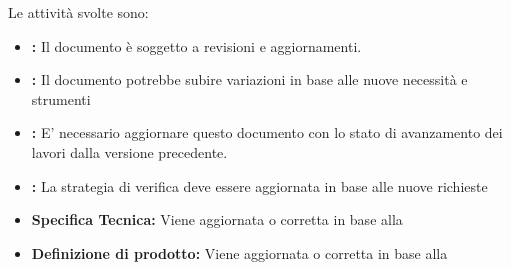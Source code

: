 \documentclass[12pt,a4paper]{article}
\begin{document}
Le attività svolte sono:
\begin{itemize}
\item \textbf{\AdR:} 
Il documento è soggetto a revisioni e aggiornamenti.
\item \textbf{\NdP:}
Il documento potrebbe subire variazioni in base
alle nuove necessità e strumenti
\item \textbf{\PdP:}
E' necessario aggiornare questo documento con lo stato di avanzamento
dei lavori dalla versione precedente.
\item \textbf{\PdQ:}
La strategia di verifica deve essere aggiornata in base 
alle nuove richieste
\item \textbf{Specifica Tecnica:}
Viene aggiornata o corretta in base alla \RP
\item \textbf{Definizione di prodotto:}
Viene aggiornata o corretta in base alla \RP
\end{itemize}
\end{document}
